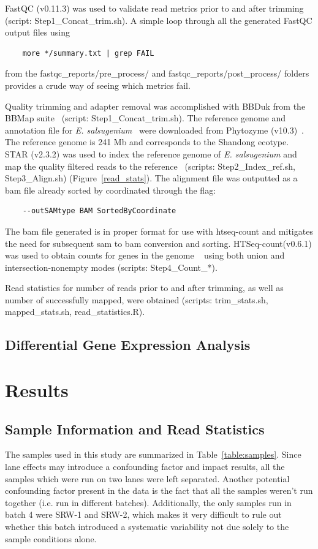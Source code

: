 \documentclass[12pt]{article}
\newcommand{\esal}{\textit{E. salsugenium}}
\begin{document}
	FastQC (v0.11.3) was used to validate read metrics prior to and after trimming~\cite{andrews2010fastqc} (script: Step1\_Concat\_trim.sh). A simple loop through all the generated FastQC output files using
	\begin{lstlisting}
	more */summary.txt | grep FAIL
	\end{lstlisting}
	from the fastqc\_reports/pre\_process/ and fastqc\_reports/post\_process/ folders provides a crude way of seeing which metrics fail.
	
	Quality trimming and adapter removal was accomplished with BBDuk from the BBMap suite~\cite{bbmap} (script: Step1\_Concat\_trim.sh). The reference genome and annotation file for \esal{}~\cite{yang2013reference} were downloaded from Phytozyme (v10.3)~\cite{goodstein2012phytozome}. The reference genome is 241 Mb and corresponds to the Shandong ecotype. STAR (v2.3.2) was used to index the reference genome of \esal{} and map the quality filtered reads to the reference~\cite{dobin2013star} (scripts: Step2\_Index\_ref.sh, Step3\_Align.sh) (Figure~\ref{read_stats}). The alignment file was outputted as a bam file already sorted by coordinated through the flag:
	\begin{lstlisting}
	--outSAMtype BAM SortedByCoordinate
	\end{lstlisting}
	
	The bam file generated is in proper format for use with htseq-count and mitigates the need for subsequent sam to bam conversion and sorting. HTSeq-count(v0.6.1) was used to obtain counts for genes in the genome ~\cite{anders2014htseq} using both union and intersection-nonempty modes (scripts: Step4\_Count\_*). 
	
	Read statistics for number of reads prior to and after trimming, as well as number of successfully mapped, were obtained (scripts: trim\_stats.sh, mapped\_stats.sh, read\_statistics.R). 

	\subsection{Differential Gene Expression Analysis}
	\section{Results}
	\subsection{Sample Information and Read Statistics}
	The samples used in this study are summarized in Table~\ref{table:samples}. Since lane effects may introduce a confounding factor and impact results, all the samples which were run on two lanes were left separated. Another potential confounding factor present in the data is the fact that all the samples weren't run together (i.e. run in different batches). Additionally, the only samples run in batch 4 were SRW-1 and SRW-2, which makes it very difficult to rule out whether this batch introduced a systematic variability not due solely to the sample conditions alone. 
	
\end{document}

